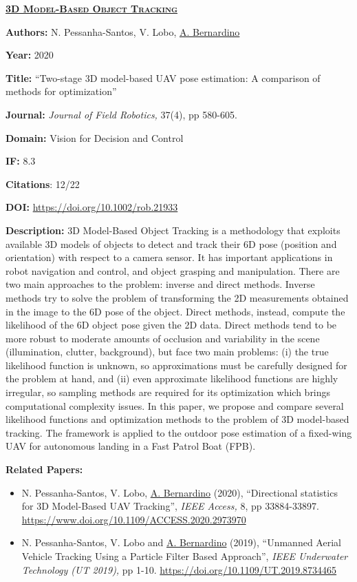 \clearpage

\textbf{\textsc{\ul{3D Model-Based Object Tracking}}}

\textbf{Authors:} N. Pessanha-Santos, V. Lobo, \ul{A. Bernardino}

\textbf{Year:} 2020

\textbf{Title:} ``Two-stage 3D model-based UAV pose estimation: A
comparison of methods for optimization''

\textbf{Journal:} \emph{Journal of Field Robotics,} 37(4), pp 580-605.

\textbf{Domain:} Vision for Decision and Control

\textbf{IF:} 8.3

\textbf{Citations}: 12/22

\textbf{DOI:} \url{https://doi.org/10.1002/rob.21933}~

\textbf{Description:} 3D Model-Based Object Tracking is a methodology
that exploits available 3D models of objects to detect and track their
6D pose (position and orientation) with respect to a camera sensor. It
has important applications in robot navigation and control, and object
grasping and manipulation. There are two main approaches to the problem:
inverse and direct methods. Inverse methods try to solve the problem of
transforming the 2D measurements obtained in the image to the 6D pose of
the object. Direct methods, instead, compute the likelihood of the 6D
object pose given the 2D data. Direct methods tend to be more robust to
moderate amounts of occlusion and variability in the scene
(illumination, clutter, background), but face two main problems: (i) the
true likelihood function is unknown, so approximations must be carefully
designed for the problem at hand, and (ii) even approximate likelihood
functions are highly irregular, so sampling methods are required for its
optimization which brings computational complexity issues. In this
paper, we propose and compare several likelihood functions and
optimization methods to the problem of 3D model-based tracking. The
framework is applied to the outdoor pose estimation of a fixed-wing UAV
for autonomous landing in a Fast Patrol Boat (FPB).

\textbf{Related Papers:}

\begin{itemize}
\item
  N. Pessanha-Santos, V. Lobo, \ul{A. Bernardino} (2020), ``Directional
  statistics for 3D Model-Based UAV Tracking'', \emph{IEEE Access,} 8,
  pp 33884-33897. \url{https://www.doi.org/10.1109/ACCESS.2020.2973970}~
\item
  N. Pessanha-Santos, V. Lobo and \ul{A. Bernardino} (2019), ``Unmanned
  Aerial Vehicle Tracking Using a Particle Filter Based Approach'',
  \emph{IEEE Underwater Technology (UT 2019),} pp 1-10.
  \url{https://doi.org/10.1109/UT.2019.8734465}
\end{itemize}

